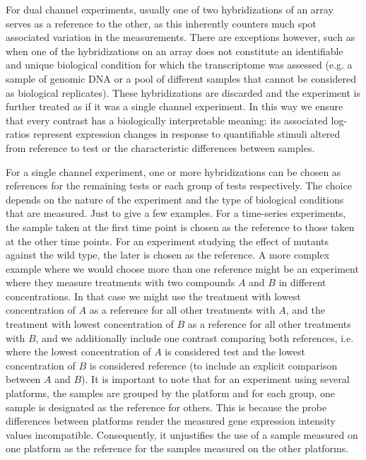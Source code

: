 For dual channel experiments, usually one of two hybridizations of an array
serves as a reference to the other, as this inherently counters much spot
associated variation in the measurements.
%
There are exceptions however, such as when one of the hybridizations on an
array does not constitute an identifiable and unique biological condition for
which the transcriptome was assessed (e.g. a sample of genomic DNA or a pool of
different samples that cannot be considered as biological replicates).
%
These hybridizations are discarded and the experiment is further treated as if
it was a single channel experiment.
%
In this way we ensure that every contrast has a biologically interpretable
meaning: its associated log-ratios represent expression changes in response
to quantifiable stimuli altered from reference to test or the characteristic
differences between samples.

For a single channel experiment, one or more hybridizations can be chosen as
references for the remaining tests or each group of tests respectively.
%
The choice depends on the nature of the experiment and the type of biological
conditions that are measured.
%
Just to give a few examples.  For a time-series experiments, the sample taken
at the first time point is chosen as the reference to those taken at the other
time points.  For an experiment studying the effect of mutants against the wild
type, the later is chosen as the reference.
%
A more complex example where we would choose more than one reference might be
an experiment where they measure treatments with two compounds $A$ and $B$ in
different concentrations. In that case we might use the treatment with lowest
concentration of $A$ as a reference for all other treatments with $A$, and the
treatment with lowest concentration of $B$ as a reference for all other
treatments with $B$, and we additionally include one contrast comparing both
references, i.e. where the lowest concentration of $A$ is considered test and
the lowest concentration of $B$ is considered reference (to include an explicit
comparison between $A$ and $B$).
%
It is important to note that for an experiment using several platforms, the
samples are grouped by the platform and for each group, one sample is
designated as the reference for others.  This is because the probe differences
between platforms render the measured gene expression intensity values
incompatible.  Consequently, it unjustifies the use of a sample measured on
one platform as the reference for the samples measured on the other platforms.

